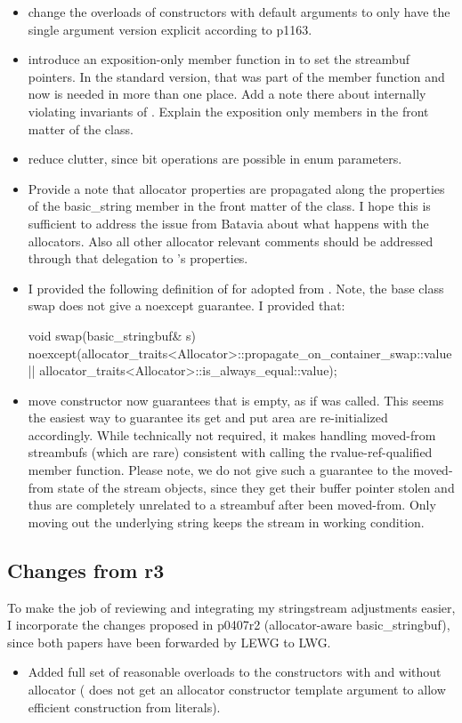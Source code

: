 \documentclass[ebook,11pt,article]{memoir}
\begin{document}
\begin{itemize}
\item change the overloads of constructors with default arguments to only have the single argument version explicit according to p1163.
\item introduce an exposition-only member function  in  to set the streambuf pointers. In the standard version, that was part of the  member function and now is needed in more than one place. Add a note there about internally violating invariants of . Explain the exposition only members in the front matter of the class.
\item reduce clutter, since bit operations are possible in enum  parameters.
\item Provide a note that allocator properties are propagated along the properties of the basic_string member  in the front matter of the class. I hope this is sufficient to address the issue from Batavia about what happens with the allocators. Also all other allocator relevant comments should be addressed through that delegation to 's properties.
\item I provided the following definition of  for  adopted from . Note, the base class swap does not give a noexcept guarantee. I provided that:
\begin{codeblock}
void swap(basic_stringbuf& s)
  noexcept(allocator_traits<Allocator>::propagate_on_container_swap::value ||
           allocator_traits<Allocator>::is_always_equal::value);
\end{codeblock}
\item {} move constructor now guarantees that  is empty, as if  was called. This seems the easiest way to guarantee its get and put area are re-initialized accordingly. While technically not required, it makes handling moved-from streambufs (which are rare) consistent with calling the rvalue-ref-qualified  member function. Please note, we do not give such a guarantee to the moved-from state of the stream objects, since they get their buffer pointer stolen and thus are completely unrelated to a streambuf after been moved-from. Only moving out the underlying string keeps the stream in working condition.
\end{itemize}


\subsection{Changes from r3}
To make the job of reviewing and integrating my stringstream adjustments easier, I incorporate the changes proposed in p0407r2 (allocator-aware basic\_stringbuf), since both papers have been forwarded by LEWG to LWG.
\begin{itemize}
\item Added full set of reasonable overloads to the constructors with and without allocator ( does not get an allocator constructor template argument to allow efficient construction from  literals).
\end{itemize}
\end{document}
